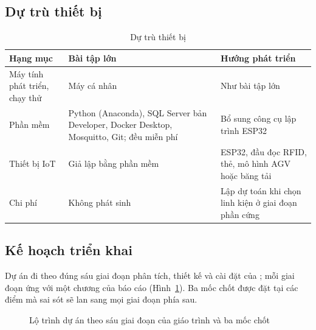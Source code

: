 \subsection{Dự trù thiết bị}

\begin{table}[H]
\centering
\caption{Dự trù thiết bị}
\label{tab:dutru}
\small
\begin{tabularx}{\textwidth}{L{3.2cm} Y L{4.4cm}}
\toprule
\textbf{Hạng mục} & \textbf{Bài tập lớn} & \textbf{Hướng phát triển} \\
\midrule
Máy tính phát triển, chạy thử & Máy cá nhân & Như bài tập lớn \\
Phần mềm & Python (Anaconda), SQL Server bản Developer, Docker Desktop, Mosquitto, Git; đều miễn phí & Bổ sung công cụ lập trình ESP32 \\
Thiết bị IoT & Giả lập bằng phần mềm & ESP32, đầu đọc RFID, thẻ, mô hình AGV hoặc băng tải \\
Chi phí & Không phát sinh & Lập dự toán khi chọn linh kiện ở giai đoạn phần cứng \\
\bottomrule
\end{tabularx}
\end{table}

\subsection{Kế hoạch triển khai}
Dự án đi theo đúng sáu giai đoạn phân tích, thiết kế và cài đặt của \cite[Ch.~1]{tung_qlhttt}; mỗi giai đoạn ứng với một chương của báo cáo (Hình~\ref{fig:lotrinh}). Ba mốc chốt được đặt tại các điểm mà sai sót sẽ lan sang mọi giai đoạn phía sau.

\begin{figure}[H]
\centering
{}
\caption{Lộ trình dự án theo sáu giai đoạn của giáo trình và ba mốc chốt}
\label{fig:lotrinh}
\end{figure}
